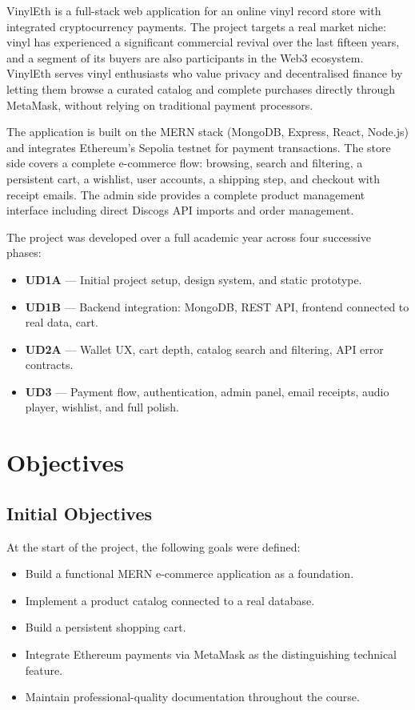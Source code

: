 \documentclass[11pt, a4paper]{report}
\begin{document}
VinylEth is a full-stack web application for an online vinyl record store with integrated cryptocurrency payments. The project targets a real market niche: vinyl has experienced a significant commercial revival over the last fifteen years, and a segment of its buyers are also participants in the Web3 ecosystem. VinylEth serves vinyl enthusiasts who value privacy and decentralised finance by letting them browse a curated catalog and complete purchases directly through MetaMask, without relying on traditional payment processors.

The application is built on the MERN stack (MongoDB, Express, React, Node.js) and integrates Ethereum's Sepolia testnet for payment transactions. The store side covers a complete e-commerce flow: browsing, search and filtering, a persistent cart, a wishlist, user accounts, a shipping step, and checkout with receipt emails. The admin side provides a complete product management interface including direct Discogs API imports and order management.

The project was developed over a full academic year across four successive phases:

\begin{itemize}
  \item \textbf{UD1A} — Initial project setup, design system, and static prototype.
  \item \textbf{UD1B} — Backend integration: MongoDB, REST API, frontend connected to real data, cart.
  \item \textbf{UD2A} — Wallet UX, cart depth, catalog search and filtering, API error contracts.
  \item \textbf{UD3} — Payment flow, authentication, admin panel, email receipts, audio player, wishlist, and full polish.
\end{itemize}

\chapter{Objectives}

\section{Initial Objectives}

At the start of the project, the following goals were defined:

\begin{itemize}
  \item Build a functional MERN e-commerce application as a foundation.
  \item Implement a product catalog connected to a real database.
  \item Build a persistent shopping cart.
  \item Integrate Ethereum payments via MetaMask as the distinguishing technical feature.
  \item Maintain professional-quality documentation throughout the course.
\end{itemize}
\end{document}
